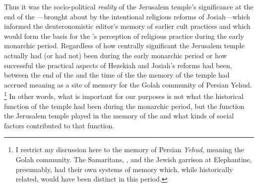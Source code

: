 Thus it was the socio-political \emph{reality} of the Jerusalem temple's significance at the end of the ---brought about by the intentional religious reforms of Josiah---which informed the deuteronomistic editor's memory of earlier \yahwistic cult practices and which would form the basis for the \chronicler's perception of religious practice during the early monarchic period. Regardless of how centrally significant the Jerusalem temple actually had (or had not) been during the early monarchic period or how successful the practical aspects of Hezekiah and Josiah's reforms had been, between the end of the  and the time of the \chronicler the memory of the temple had accrued meaning as a site of memory for the Golah community of Persian Yehud.%
    \footnote{I restrict my discussion here to the memory of Persian \emph{Yehud}, meaning the Golah community. The Samaritans, , and the Jewish garrison at Elephantine, presumably, had their own systems of memory which, while historically related, would have been distinct in this period.}
In other words, what is important for our purposes is not what the historical function of the temple had been during the monarchic period, but the function the Jerusalem temple played in the memory of the \chronicler and what kinds of social factors contributed to that function.

